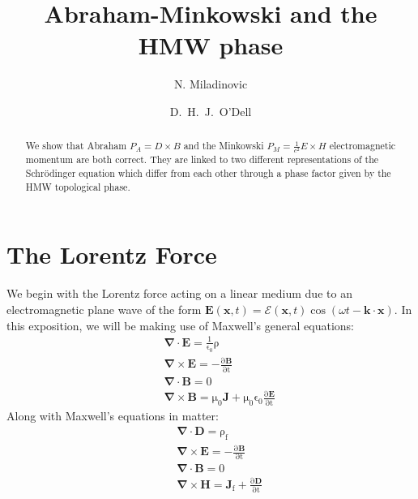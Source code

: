 \documentclass[twocolumn,english,pra,aps,superscriptaddress,floatfix]{revtex4-1}
\begin{document}
\author{N. Miladinovic}
\author{D.\ H.\ J.\ O'Dell}

\title{Abraham-Minkowski and the HMW phase}

\begin{abstract}
\label{sec:abstract}
We show that Abraham $P_A=D\times B$ and the Minkowski $P_M=\frac{1}{c^2}E\times H$ electromagnetic momentum are both correct.  They are linked to two different representations of the Schr\"{o}dinger equation which differ from each other through a phase factor given by the HMW topological phase.
\end{abstract}


\maketitle

\section{The Lorentz Force}
\label{sec:lorentz}
We begin with the Lorentz force acting on a linear medium due to an electromagnetic plane wave of the form $\mathbf{E}(\mathbf{x},t)=\mathbf{\mathcal{E}}(\mathbf{x},t)\cos{(\omega t -\mathbf{k\cdot x})}$. In this exposition, we will be making use of Maxwell's general equations:
\begin{eqnarray}
&&\mathrm{\mathbf{\nabla}\cdot\mathbf{E}=\frac{1}{\epsilon_0}\rho} \\
&&\mathrm{\mathbf{\nabla}\times\mathbf{E}=-\frac{\partial \mathbf{B}}{\partial t}} \\
&&\mathrm{\mathbf{\nabla}\cdot\mathbf{B}=0} \\
&&\mathrm{\mathbf{\nabla}\times\mathbf{B}=\mu_0\mathbf{J}+\mu_0 \epsilon_0\frac{\partial \mathbf{E}}{\partial t}}
\end{eqnarray}
Along with Maxwell's equations in matter:
\begin{eqnarray}
&&\mathrm{\mathbf{\nabla}\cdot\mathbf{D}=\rho_f} \\
&&\mathrm{\mathbf{\nabla}\times\mathbf{E}=-\frac{\partial \mathbf{B}}{\partial t}} \\
&&\mathrm{\mathbf{\nabla}\cdot\mathbf{B}=0} \\
&&\mathrm{\mathbf{\nabla}\times\mathbf{H}=\mathbf{J}_f+\frac{\partial \mathbf{D}}{\partial t}}
\end{eqnarray}
\end{document}
